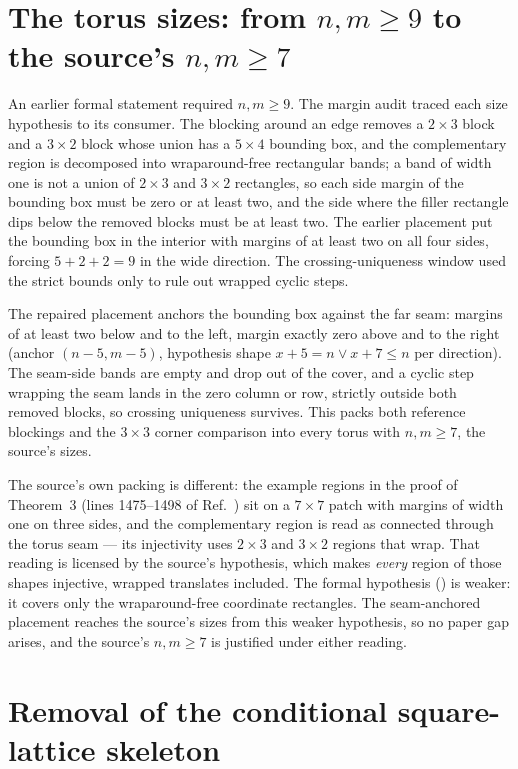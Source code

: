 \documentclass{article}
\begin{document}
\section*{The torus sizes: from $n,m\geq 9$ to the source's $n,m\geq 7$}

An earlier formal statement required $n,m\geq 9$. The margin audit traced each size
hypothesis to its consumer. The blocking around an edge removes a $2\times3$ block
and a $3\times2$ block whose union has a $5\times4$ bounding box, and the
complementary region is decomposed into wraparound-free rectangular bands; a band of
width one is not a union of $2\times3$ and $3\times2$ rectangles, so each side
margin of the bounding box must be zero or at least two, and the side where the
filler rectangle dips below the removed blocks must be at least two. The earlier
placement put the bounding box in the interior with margins of at least two on all
four sides, forcing $5+2+2 = 9$ in the wide direction. The crossing-uniqueness
window used the strict bounds only to rule out wrapped cyclic steps.

The repaired placement anchors the bounding box against the far seam: margins of at
least two below and to the left, margin exactly zero above and to the right
(anchor $(n-5, m-5)$, hypothesis shape $x + 5 = n \lor x + 7 \le n$ per direction).
The seam-side bands are empty and drop out of the cover, and a cyclic step wrapping
the seam lands in the zero column or row, strictly outside both removed blocks, so
crossing uniqueness survives. This packs both reference blockings and the $3\times3$
corner comparison into every torus with $n,m\geq 7$, the source's sizes.

The source's own packing is different: the example regions in the proof of
Theorem~3 (lines 1475--1498 of Ref.~\cite{Molnar2018NormalPEPS}) sit on a
$7\times7$
patch with margins of width one on three sides, and the complementary region is
read as connected through the torus seam --- its injectivity uses $2\times3$ and
$3\times2$ regions that wrap. That reading is licensed by the source's hypothesis,
which makes \emph{every} region of those shapes injective, wrapped translates
included. The formal hypothesis ()
is weaker: it covers only the wraparound-free coordinate rectangles. The
seam-anchored placement reaches the source's sizes from this weaker hypothesis, so
no paper gap arises, and the source's $n,m\geq 7$ is justified under either
reading.

\section*{Removal of the conditional square-lattice skeleton}
\end{document}
